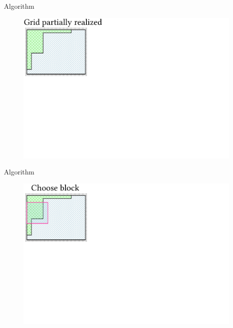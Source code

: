 \documentclass{beamer}
\begin{document}

  \begin{frame}[fragile]{Algorithm}
    \begin{figure}
      \includegraphics[width=\textwidth]{figs/poms_alg0.pdf}
    \end{figure}
  \end{frame}

  \begin{frame}[fragile]{Algorithm}
    \begin{figure}
      \includegraphics[width=\textwidth]{figs/poms_alg1.pdf}
    \end{figure}
  \end{frame}
\end{document}
